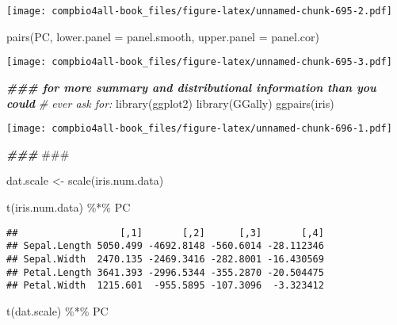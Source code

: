 \documentclass[
]{book}
\newenvironment{Shaded}{\begin{snugshade}}{\end{snugshade}}
\newcommand{\AlertTok}[1]{\textcolor[rgb]{0.94,0.16,0.16}{#1}}
\newcommand{\AttributeTok}[1]{\textcolor[rgb]{0.77,0.63,0.00}{#1}}
\newcommand{\CommentTok}[1]{\textcolor[rgb]{0.56,0.35,0.01}{\textit{#1}}}
\newcommand{\DocumentationTok}[1]{\textcolor[rgb]{0.56,0.35,0.01}{\textbf{\textit{#1}}}}
\newcommand{\FunctionTok}[1]{\textcolor[rgb]{0.00,0.00,0.00}{#1}}
\newcommand{\NormalTok}[1]{#1}
\newcommand{\OtherTok}[1]{\textcolor[rgb]{0.56,0.35,0.01}{#1}}
\newcommand{\SpecialCharTok}[1]{\textcolor[rgb]{0.00,0.00,0.00}{#1}}
\begin{document}
\texttt{[image: compbio4all-book\_files/figure-latex/unnamed-chunk-695-2.pdf]}

\begin{Shaded}
\begin{Highlighting}[]
\FunctionTok{pairs}\NormalTok{(PC, }\AttributeTok{lower.panel =}\NormalTok{ panel.smooth, }\AttributeTok{upper.panel =}\NormalTok{ panel.cor)}
\end{Highlighting}
\end{Shaded}

\texttt{[image: compbio4all-book\_files/figure-latex/unnamed-chunk-695-3.pdf]}

\begin{Shaded}
\begin{Highlighting}[]
\DocumentationTok{\#\#\# for more summary and distributional information than you could }
\CommentTok{\#   ever ask for:}
\FunctionTok{library}\NormalTok{(ggplot2)}
\FunctionTok{library}\NormalTok{(GGally)}
\FunctionTok{ggpairs}\NormalTok{(iris)}
\end{Highlighting}
\end{Shaded}

\texttt{[image: compbio4all-book\_files/figure-latex/unnamed-chunk-696-1.pdf]}

\begin{Shaded}
\begin{Highlighting}[]
\DocumentationTok{\#\#\# }\AlertTok{\#\#\#}

\NormalTok{dat.scale }\OtherTok{\textless{}{-}} \FunctionTok{scale}\NormalTok{(iris.num.data)}

\FunctionTok{t}\NormalTok{(iris.num.data) }\SpecialCharTok{\%*\%}\NormalTok{ PC}
\end{Highlighting}
\end{Shaded}

\begin{verbatim}
##                  [,1]       [,2]      [,3]       [,4]
## Sepal.Length 5050.499 -4692.8148 -560.6014 -28.112346
## Sepal.Width  2470.135 -2469.3416 -282.8001 -16.430569
## Petal.Length 3641.393 -2996.5344 -355.2870 -20.504475
## Petal.Width  1215.601  -955.5895 -107.3096  -3.323412
\end{verbatim}

\begin{Shaded}
\begin{Highlighting}[]
\FunctionTok{t}\NormalTok{(dat.scale) }\SpecialCharTok{\%*\%}\NormalTok{ PC}
\end{Highlighting}
\end{Shaded}
\end{document}

